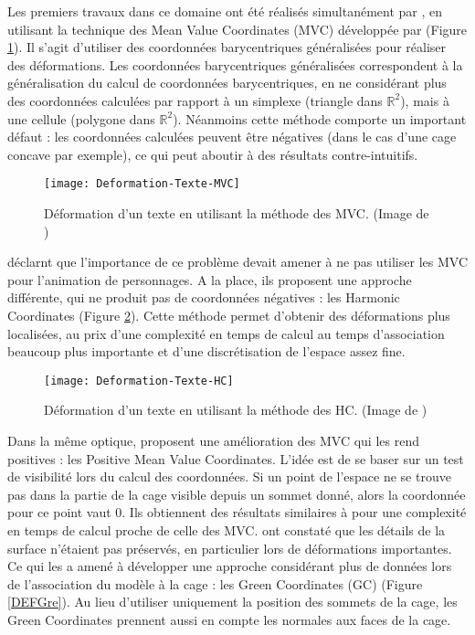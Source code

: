 Les premiers travaux dans ce domaine ont été réalisés simultanément par
\cite{JSW05} \cite{FKR05}, en utilisant la technique des Mean Value
Coordinates (MVC) développée par \cite{Flo03} (Figure \ref{DEFMea}). Il s'agit
d'utiliser des coordonnées barycentriques généralisées pour réaliser des
déformations. Les coordonnées barycentriques généralisées correspondent à la
généralisation du calcul de coordonnées barycentriques, en ne considérant plus
des coordonnées calculées par rapport à un simplexe (triangle dans
$\mathbb{R}^2$), mais à une cellule (polygone dans $\mathbb{R}^2$). Néanmoins
cette méthode comporte un important défaut : les coordonnées calculées peuvent
être négatives (dans le cas d'une cage concave par exemple), ce qui peut
aboutir à des résultats contre-intuitifs.

\begin{figure}[ht]
\begin{center}
\texttt{[image: Deformation-Texte-MVC]}

\caption[Déformation d'un texte (MVC)] {Déformation d'un texte en utilisant la
méthode des MVC. (Image de \cite{LLC08})}

\label{DEFMea}
\end{center}
\end{figure}

\cite{JMDGS07} déclarnt que l'importance de ce problème devait amener à ne pas
utiliser les MVC pour l'animation de personnages. A la place, ils proposent
une approche différente, qui ne produit pas de coordonnées négatives : les
Harmonic Coordinates (Figure \ref{DEFHar}). Cette méthode permet d'obtenir
des déformations plus localisées, au prix d'une complexité en temps de calcul
au temps d'association beaucoup plus importante et d'une discrétisation de
l'espace assez fine.

\begin{figure}[ht]
\begin{center}
\texttt{[image: Deformation-Texte-HC]}

\caption[Déformation d'un texte (HC)] {Déformation d'un texte en utilisant la
méthode des HC. (Image de \cite{LLC08})}

\label{DEFHar}
\end{center}
\end{figure}

Dans la même optique, \cite{LKCL07} proposent une amélioration des MVC qui les
rend positives : les Positive Mean Value Coordinates. L'idée est de se baser
sur un test de visibilité lors du calcul des coordonnées. Si un point de
l'espace ne se trouve pas dans la partie de la cage visible depuis un sommet
donné, alors la coordonnée pour ce point vaut 0. Ils obtiennent des résultats
similaires à \cite{JMDGS07} pour une complexité en temps de calcul proche de
celle des MVC. \cite{LLC08} ont constaté que les détails de la surface
n'étaient pas préservés, en particulier lors de déformations importantes. Ce
qui les a amené à développer une approche considérant plus de données lors de
l'association du modèle à la cage : les Green Coordinates (GC) (Figure
\ref{DEFGre}). Au lieu d'utiliser uniquement la position des sommets de la
cage, les Green Coordinates prennent aussi en compte les normales aux faces de
la cage.


